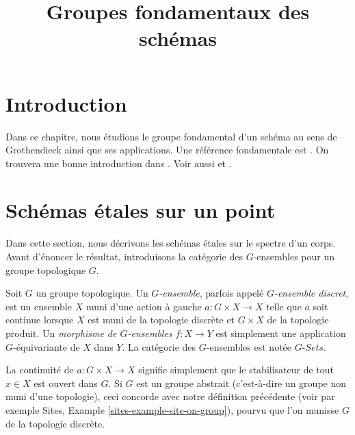 

%


\title{Groupes fondamentaux des schémas}


\maketitle

\label{section-phantom}

\tableofcontents

\section{Introduction}
\label{section-introduction}

\noindent
Dans ce chapitre, nous étudions le groupe fondamental d'un schéma au sens de
Grothendieck ainsi que ses applications. Une référence fondamentale est
\cite{SGA1}. On trouvera une bonne introduction dans \cite{Lenstra}.
Voir aussi \cite{Murre-lectures} et \cite{Grothendieck-Murre}.










\section{Schémas étales sur un point}
\label{section-schemes-etale-point}

\noindent
Dans cette section, nous décrivons les schémas étales sur le spectre d'un
corps. Avant d'énoncer le résultat, introduisons la catégorie des
$G$-ensembles pour un groupe topologique $G$.

\begin{definition}
\label{definition-G-set-continuous}
Soit $G$ un groupe topologique.
Un {\it $G$-ensemble}, parfois appelé {\it $G$-ensemble discret},
est un ensemble $X$ muni d'une action à gauche $a : G \times X \to X$
telle que $a$ soit continue lorsque $X$ est muni de la topologie discrète et
$G \times X$ de la topologie produit.
Un {\it morphisme de $G$-ensembles} $f : X \to Y$ est simplement une
application $G$-équivariante de $X$ dans $Y$.
La catégorie des $G$-ensembles est notée {\it $G\textit{-Sets}$}.
\end{definition}

\noindent
La continuité de $a : G \times X \to X$ signifie simplement que le
stabilisateur de tout $x \in X$ est ouvert dans $G$.
Si $G$ est un groupe abstrait (c'est-à-dire un groupe non muni d'une
topologie), ceci concorde avec notre définition précédente (voir par exemple
Sites, Example \ref{sites-example-site-on-group}), pourvu que l'on munisse
$G$ de la topologie discrète.

